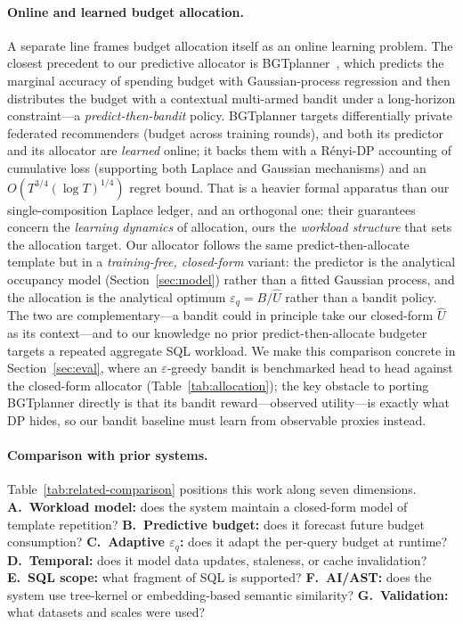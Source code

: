 \documentclass[sigconf,nonacm]{acmart}
\newcommand{\eps}{\varepsilon}
\begin{document}
\paragraph{Online and learned budget allocation.}
A separate line frames budget allocation itself as an online learning problem. The closest precedent to our predictive allocator is BGTplanner~\cite{zhang2024bgtplanner}, which predicts the marginal accuracy of spending budget with Gaussian-process regression and then distributes the budget with a contextual multi-armed bandit under a long-horizon constraint---a \emph{predict-then-bandit} policy. BGTplanner targets differentially private federated recommenders (budget across training rounds), and both its predictor and its allocator are \emph{learned} online; it backs them with a R\'enyi-DP accounting of cumulative loss (supporting both Laplace and Gaussian mechanisms) and an $O(T^{3/4}(\log T)^{1/4})$ regret bound. That is a heavier formal apparatus than our single-composition Laplace ledger, and an orthogonal one: their guarantees concern the \emph{learning dynamics} of allocation, ours the \emph{workload structure} that sets the allocation target. Our allocator follows the same predict-then-allocate template but in a \emph{training-free, closed-form} variant: the predictor is the analytical occupancy model (Section~\ref{sec:model}) rather than a fitted Gaussian process, and the allocation is the analytical optimum $\eps_q=B/\hat U$ rather than a bandit policy. The two are complementary---a bandit could in principle take our closed-form $\hat U$ as its context---and to our knowledge no prior predict-then-allocate budgeter targets a repeated aggregate SQL workload. We make this comparison concrete in Section~\ref{sec:eval}, where an $\eps$-greedy bandit is benchmarked head to head against the closed-form allocator (Table~\ref{tab:allocation}); the key obstacle to porting BGTplanner directly is that its bandit reward---observed utility---is exactly what DP hides, so our bandit baseline must learn from observable proxies instead.

\paragraph{Comparison with prior systems.}
Table~\ref{tab:related-comparison} positions this work along seven dimensions. \textbf{A.~Workload model:} does the system maintain a closed-form model of template repetition? \textbf{B.~Predictive budget:} does it forecast future budget consumption? \textbf{C.~Adaptive $\eps_q$:} does it adapt the per-query budget at runtime? \textbf{D.~Temporal:} does it model data updates, staleness, or cache invalidation? \textbf{E.~SQL scope:} what fragment of SQL is supported? \textbf{F.~AI/AST:} does the system use tree-kernel or embedding-based semantic similarity? \textbf{G.~Validation:} what datasets and scales were used?
\end{document}
